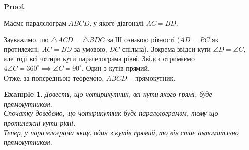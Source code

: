 \documentclass[a4paper, 10pt]{article}
\makeatletter
\theoremstyle{theoremdd}
\theoremstyle{theoremdd}
\theoremstyle{theoremdd}
\theoremstyle{theoremdd}
\theoremstyle{theoremdd}
\newtheorem{example}[theorem]{Example}
\theoremstyle{theoremdd}
\theoremstyle{theoremdd}
\theoremstyle{theoremdd}
\theoremstyle{theoremdd}
\renewenvironment{proof}[1][Proof.\\]{\par
\pushQED{\hfill \qed}%
\normalfont \topsep6\p@\@plus6\p@\relax
\trivlist
\item\relax
{\bfseries
#1\@addpunct{.}}\hspace\labelsep\ignorespaces
}{%
\popQED\endtrivlist\@endpefalse
}
\makeatother
\begin{document}
\begin{proof}
Маємо паралелограм $ABCD$, у якого діагоналі $AC = BD$.
\begin{figure}[H]
\centering
{}
\end{figure}
Зауважимо, що $\triangle ACD = \triangle BDC$ за ІІІ ознакою рівності ($AD = BC$ як протилежні, $AC = BD$ за умовою, $DC$ спільна). Зокрема звідси кути $\angle D = \angle C$, але тоді всі чотири кути паралелограма рівні. Звідси отримаємо $4 \angle C = 360^\circ \implies \angle C = 90^\circ$. Один з кутів прямий. \\
Отже, за попередньою теоремою, $ABCD$ -- прямокутник.
\end{proof}

\begin{example}
Довести, що чотирикутник, всі кути якого прямі, буде прямокутником.\\
Спочатку доведемо, що чотирикутник буде паралелограмом, тому що протилежні кути рівні.\\
Тепер, у паралелограма якщо один з кутів прямий, то він стає автоматично прямокутником.
\end{example}
\end{document}

